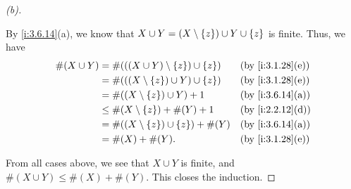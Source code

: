 \begin{proof}[(b)]
\begin{itemize}
          By \cref{i:3.6.14}(a), we know that \(X \cup Y = (X \setminus \left\lbrace z\right\rbrace) \cup Y \cup \left\lbrace z\right\rbrace\) is finite.
          Thus, we have
          \begin{align*}
            \#(X \cup Y) & = \#(((X \cup Y) \setminus \set{z}) \cup \set{z}) &  & \by{i:3.1.28}[e] \\
                         & = \#(((X \setminus \set{z}) \cup Y) \cup \set{z}) &  & \by{i:3.1.28}[e] \\
                         & = \#((X \setminus \set{z}) \cup Y) + 1            &  & \by{i:3.6.14}[a] \\
                         & \leq \#(X \setminus \set{z}) + \#(Y) + 1          &  & \by{i:2.2.12}[d] \\
                         & = \#((X \setminus \set{z}) \cup \set{z}) + \#(Y)  &  & \by{i:3.6.14}[a] \\
                         & = \#(X) + \#(Y).                                  &  & \by{i:3.1.28}[e]
          \end{align*}
  \end{itemize}
  From all cases above, we see that \(X \cup Y\) is finite, and \(\#(X \cup Y) \leq \#(X) + \#(Y)\).
  This closes the induction.


\end{proof}
